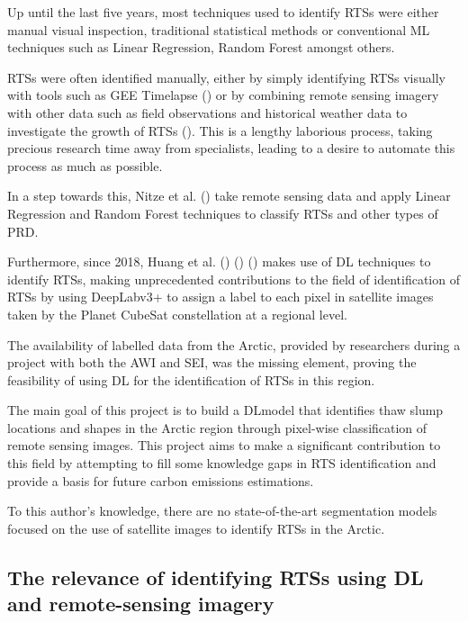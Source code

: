 Up until the last five years, most techniques used to identify \gls{RTS}s were either manual visual inspection, traditional statistical methods or conventional \gls{ML} techniques such as Linear Regression, Random Forest amongst others.

\gls{RTS}s were often identified manually, either by simply identifying \gls{RTS}s visually with tools such as \gls{GEE} Timelapse (\cite{lewkowicz_extremes_2019}) or by combining remote sensing imagery with other data such as field observations and historical weather data to investigate the growth of \gls{RTS}s (\cite{KOKELJ201556}). This is a lengthy laborious process, taking precious research time away from specialists, leading to a desire to automate this process as much as possible.

In a step towards this, Nitze et al. (\cite{articleing2018}) take remote sensing data and apply Linear Regression and Random Forest techniques to classify \gls{RTS}s and other types of \gls{PRD}.

Furthermore, since 2018, Huang et al. (\cite{HUANG10122067}) (\cite{HUANG2020111534}) (\cite{HUANG2021102399}) makes use of \gls{DL} techniques to identify \gls{RTS}s, making unprecedented contributions to the field of identification of \gls{RTS}s by using DeepLabv3+ to assign a label to each pixel in satellite images taken by the Planet CubeSat constellation at a regional level.

The availability of labelled data from the Arctic, provided by researchers during a project with both the \gls{AWI} and \gls{SEI}, was the missing element, proving the feasibility of using DL for the identification of \gls{RTS}s in this region.

The main goal of this project is to build a \gls{DL}model that identifies thaw slump locations and shapes in the Arctic region through pixel-wise classification of remote sensing images. This project aims to make a significant contribution to this field by attempting to fill some knowledge gaps in \gls{RTS} identification and provide a basis for future carbon emissions estimations.

To this author's knowledge, there are no state-of-the-art segmentation models focused on the use of satellite images to identify \gls{RTS}s in the Arctic.

\subsection{The relevance of identifying \gls{RTS}s using \gls{DL} and remote-sensing imagery} \label{rts_ref}
